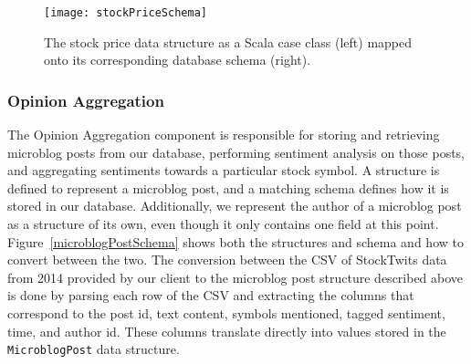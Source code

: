 \begin{figure}[h]
  \label{stockPriceSchema}
  \begin{center}
    \texttt{[image: stockPriceSchema]}
  \end{center}
  \caption{The stock price data structure as a Scala case class (left) mapped onto its corresponding database schema (right).}
\end{figure}

\subsubsection{Opinion Aggregation}

The Opinion Aggregation component is responsible for storing and retrieving microblog posts from our database, performing sentiment analysis on those posts, and aggregating sentiments towards a particular stock symbol.
A structure is defined to represent a microblog post, and a matching schema defines how it is stored in our database.
Additionally, we represent the author of a microblog post as a structure of its own, even though it only contains one field at this point.
Figure~\ref{microblogPostSchema} shows both the structures and schema and how to convert between the two.
The conversion between the CSV of StockTwits data from 2014 provided by our client to the microblog post structure described above is done by parsing each row of the CSV and extracting the columns that correspond to the post id, text content, symbols mentioned, tagged sentiment, time, and author id.
These columns translate directly into values stored in the \texttt{MicroblogPost} data structure.

